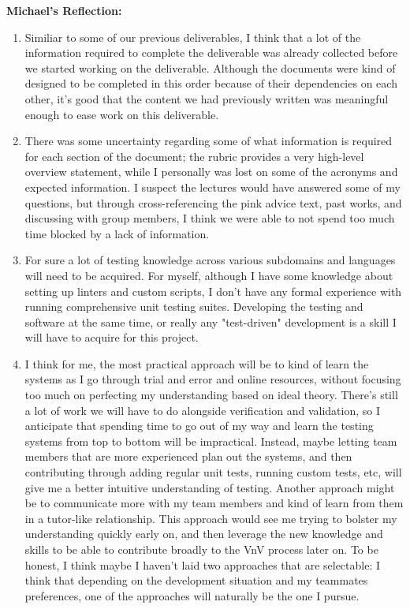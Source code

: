 \documentclass[12pt, titlepage]{article}
\begin{document}
\noindent\textbf{Michael's Reflection:}
\begin{enumerate}
  \item Similiar to some of our previous deliverables, I think that a lot of the information required to complete the deliverable was already collected before we started working on the deliverable. 
  Although the documents were kind of designed to be completed in this order because of their dependencies on each other, it's good that the content we had previously written was meaningful enough to ease
  work on this deliverable.
  \item There was some uncertainty regarding some of what information is required for each section of the document; the rubric provides a very high-level overview statement, while I personally was lost on some of the acronyms and expected information.
  I suspect the lectures would have answered some of my questions, but through cross-referencing the pink advice text, past works, and discussing with group members, I think we were able to not spend too much time blocked by a lack of information.
  \item For sure a lot of testing knowledge across various subdomains and languages will need to be acquired. For myself, although I have some knowledge about setting up linters and custom scripts, I don't have any formal experience with running comprehensive
  unit testing suites. Developing the testing and software at the same time, or really any "test-driven" development is a skill I will have to acquire for this project.
  \item I think for me, the most practical approach will be to kind of learn the systems as I go through trial and error and online resources, without focusing too much on perfecting my understanding based on ideal theory. There's still a lot of work we will have to do alongside verification and
  validation, so I anticipate that spending time to go out of my way and learn the testing systems from top to bottom will be impractical. Instead, maybe letting team members that are more experienced plan out the systems, and then contributing through adding
  regular unit tests, running custom tests, etc, will give me a better intuitive understanding of testing. Another approach might be to communicate more with my team members and kind of learn from them in a tutor-like relationship. This approach would see me trying to bolster my understanding quickly
  early on, and then leverage the new knowledge and skills to be able to contribute broadly to the VnV process later on. To be honest, I think maybe I haven't laid two approaches that are selectable: I think that depending on the development situation and my teammates preferences,
  one of the approaches will naturally be the one I pursue.
\end{enumerate}
\end{document}
